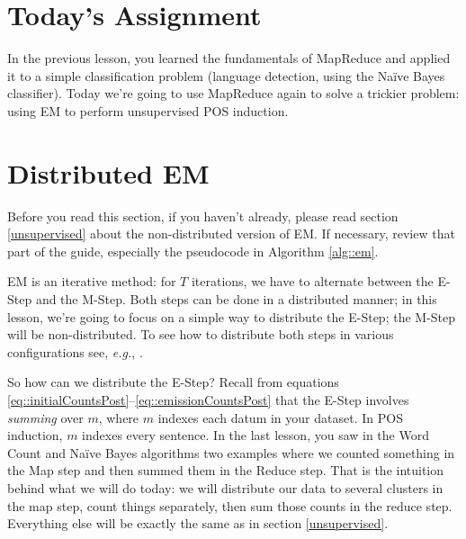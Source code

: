 \section*{Today's Assignment}
In the previous lesson, you learned the fundamentals of MapReduce and applied it to a simple classification problem (language detection, using the Na\"{i}ve Bayes classifier). Today we're going to use MapReduce again to solve a trickier problem: using EM to perform unsupervised POS induction.

\section{Distributed EM}

Before you read this section, if you haven't already, please read section \ref{unsupervised} about the non-distributed version of EM. If necessary, review that part of the guide, especially the pseudocode in Algorithm \ref{alg::em}.

EM is an iterative method: for $T$ iterations, we have to alternate between the E-Step and the M-Step. Both steps can be done in a distributed manner; in this lesson, we're going to focus on a simple way to distribute the E-Step; the M-Step will be non-distributed. To see how to distribute both steps in various configurations see, \emph{e.g.}, \cite{Wolfe2008}.

So how can we distribute the E-Step? Recall from equations \eqref{eq::initialCountsPost}--\eqref{eq::emissionCountsPost} that the E-Step involves \emph{summing} over $m$, where $m$ indexes each datum in your dataset. In POS induction, $m$ indexes every sentence. In the last lesson, you saw in the Word Count and Na\"{i}ve Bayes algorithms two examples where we counted something in the Map step and then summed them in the Reduce step. That is the intuition behind what we will do today: we will distribute our data to several clusters in the map step, count things separately, then sum those counts in the reduce step. Everything else will be exactly the same as in section \ref{unsupervised}.